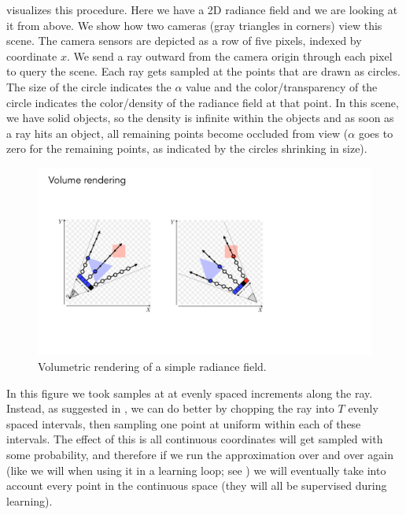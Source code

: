 \Fig{\ref{fig:nerfs:flatland_volume_rendering}} visualizes this procedure. Here we have a 2D radiance field and we are looking at it from above. We show how two cameras (gray triangles in corners) view this scene. The camera sensors are depicted as a row of five pixels, indexed by coordinate $x$. We send a ray outward from the camera origin through each pixel to query the scene. Each ray gets sampled at the points that are drawn as circles. The size of the circle indicates the $\alpha$ value and the color/transparency of the circle indicates the color/density of the radiance field at that point. In this scene, we have solid objects, so the density is infinite within the objects and as soon as a ray hits an object, all remaining points become occluded from view ($\alpha$ goes to zero for the remaining points, as indicated by the circles shrinking in size).
\begin{figure}[h!]
    \centerline{
    \includegraphics[width=0.85\linewidth]{figures/nerfs/flatland_volume_rendering.pdf}
    }
    \caption{Volumetric rendering of a simple radiance field.}
    \label{fig:nerfs:flatland_volume_rendering}
\end{figure}


In this figure we took samples at at evenly spaced increments along the ray. Instead, as suggested in \cite{mildenhall2020nerf}, we can do better by chopping the ray into $T$ evenly spaced intervals, then sampling one point at uniform within each of these intervals. The effect of this is all continuous coordinates will get sampled with some probability, and therefore if we run the approximation over and over again (like we will when using it in a learning loop; see \sect{\ref{sec:nerfs:nerf_section}}) we will eventually take into account every point in the continuous space (they will all be supervised during learning). 

